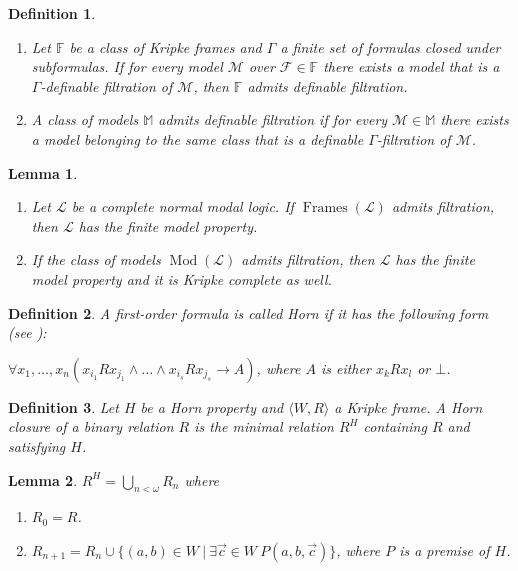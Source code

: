 \documentclass[a4paper]{article}
\theoremstyle{defin}
\newtheorem{defin}{Definition}
\theoremstyle{theorem}
\theoremstyle{prop}
\theoremstyle{lemma}
\newtheorem{lemma}{Lemma}
\theoremstyle{fact}
\theoremstyle{ex}
\theoremstyle{col}
\theoremstyle{claim}
\begin{document}
\begin{defin}
$ $

  \begin{enumerate}
    \item Let $\mathbb{F}$ be a class of Kripke frames and $\Gamma$ a finite set of formulas closed under subformulas. If for every model $\mathcal{M}$ over $\mathcal{F} \in \mathbb{F}$ there exists a model that is a $\Gamma$-definable filtration of $\mathcal{M}$, then $\mathbb{F}$ admits definable filtration.

    \item A class of models $\mathbb{M}$ admits definable filtration if for every $\mathcal{M} \in \mathbb{M}$ there exists a model belonging to the same class that is a definable $\Gamma$-filtration of $\mathcal{M}$.
  \end{enumerate}
\end{defin}

\begin{lemma}
  $ $

\begin{enumerate}
  \item Let $\mathcal{L}$ be a complete normal modal logic. If $\operatorname{Frames}(\mathcal{L})$ admits filtration, then $\mathcal{L}$ has the finite model property.
  \item If the class of models $\operatorname{Mod}(\mathcal{L})$ admits filtration, then $\mathcal{L}$ has the finite model property and it is Kripke complete as well.
\end{enumerate}
\end{lemma}

\begin{defin} A first-order formula is called Horn if it has the following form (see \cite{chang1990model}):

  \begin{center}
    $\forall x_1, \dots, x_n (x_{i_1} R x_{j_1} \land \dots \land x_{i_s} R x_{j_s} \rightarrow A)$, where $A$ is either $x_k R x_l$ or $\bot$.
  \end{center}
\end{defin}

\begin{defin}
  Let $H$ be a Horn property and $\langle W, R \rangle$ a Kripke frame. A Horn closure of a binary relation $R$ is the minimal relation $R^{H}$ containing $R$ and satisfying $H$.
\end{defin}

\begin{lemma}
  $R^{H} = \bigcup \limits_{n < \omega} R_n$ where

  \begin{enumerate}
    \item $R_0 = R$.
    \item $R_{n + 1} = R_n \cup \{ (a, b) \in W \: | \: \exists \vec{c} \in W \: P(a, b, \vec{c})\}$, where $P$ is a premise of $H$.
  \end{enumerate}
\end{lemma}
\end{document}
